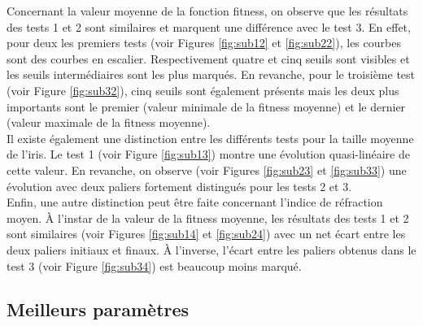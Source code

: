 \documentclass[a4paper,11pt]{article}
\begin{document}
Concernant la valeur moyenne de la fonction fitness, on observe que les résultats des tests 1 et 2 sont similaires et marquent une différence avec le test 3. En effet, pour deux les premiers tests (voir Figures \ref{fig:sub12} et \ref{fig:sub22}), les courbes sont des courbes en escalier. Respectivement quatre et cinq seuils sont visibles et les seuils intermédiaires sont les plus marqués. En revanche, pour le troisième test (voir Figure \ref{fig:sub32}), cinq seuils sont également présents mais les deux plus importants sont le premier (valeur minimale de la fitness moyenne) et le dernier (valeur maximale de la fitness moyenne).\\

Il existe également une distinction entre les différents tests pour la taille moyenne de l'iris. Le test 1 (voir Figure \ref{fig:sub13}) montre une évolution quasi-linéaire de cette valeur. En revanche, on observe (voir Figures \ref{fig:sub23} et \ref{fig:sub33}) une évolution avec deux paliers fortement distingués pour les tests 2 et 3.\\

Enfin, une autre distinction peut être faite concernant l'indice de réfraction moyen. À l'instar de la valeur de la fitness moyenne, les résultats des tests 1 et 2 sont similaires (voir Figures \ref{fig:sub14} et \ref{fig:sub24}) avec un net écart entre les deux paliers initiaux et finaux. À l'inverse, l'écart entre les paliers obtenus dans le test 3 (voir Figure \ref{fig:sub34}) est beaucoup moins marqué.

\subsection{Meilleurs paramètres}
\end{document}

